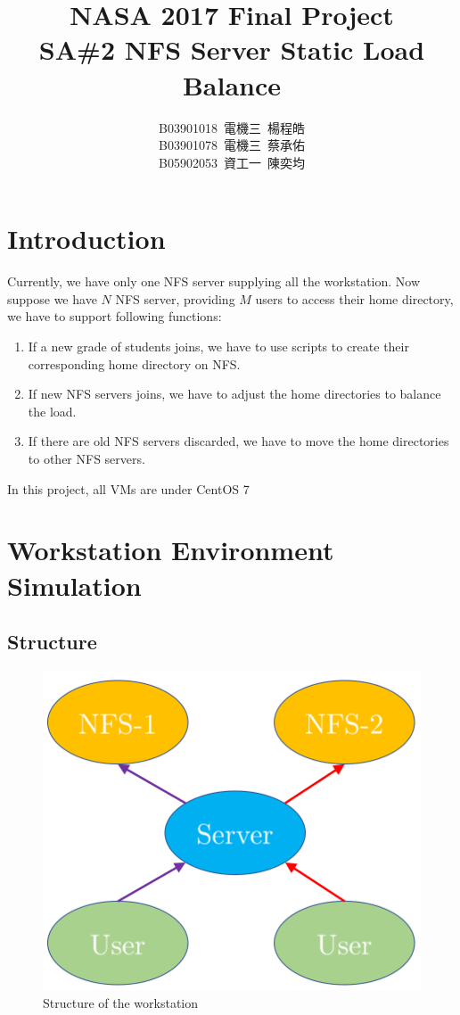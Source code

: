 \documentclass{article}
\title{NASA 2017 Final Project \\ SA\#2 NFS Server Static Load Balance}
\author{B03901018\, 電機三\, 楊程皓\\ B03901078\, 電機三\, 蔡承佑\\ B05902053\, 資工一\, 陳奕均}
\begin{document}
\newcommand{\red}[1]{\textcolor{red}{#1}}
\newcommand{\br}[1]{\left( #1 \right)}
\newcommand{\sbr}[1]{\left[ #1 \right]}
\newfontfamily{}
\maketitle
\section{Introduction}
Currently, we have only one NFS server supplying all the workstation. Now suppose we have $N$ NFS server, 
providing $M$ users to access their home directory, we have to support following functions:
   \begin{enumerate}
   \item If a new grade of students joins, we have to use scripts to create their corresponding home directory on NFS.
   \item If new NFS servers joins, we have to adjust the home directories to balance the load.
   \item If there are old NFS servers discarded, we have to move the home directories to other NFS servers.
   \end{enumerate}
In this project, all VMs are under CentOS 7

\section{Workstation Environment Simulation}
\subsection{Structure}
\begin{figure}[H]
\centering
\includegraphics[height=0.2\textheight]{Fig1.png}
\caption{Structure of the workstation}
\end{figure}
\end{document}
